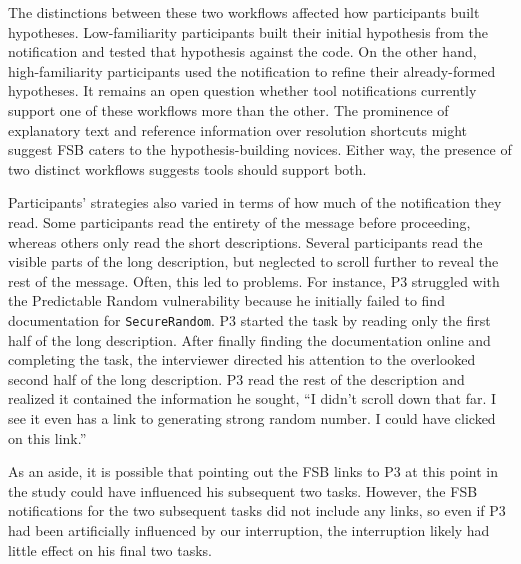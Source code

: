 \documentclass[10pt,journal,compsoc]{IEEEtran}
\begin{document}
The distinctions between these two workflows affected how participants built hypotheses.
Low-familiarity participants built their initial hypothesis from the notification and tested that hypothesis against the code. 
On the other hand, high-familiarity participants used the notification to refine their already-formed hypotheses. 
It remains an open question whether tool notifications currently support one of these workflows more than the other.
The prominence of explanatory text and reference information over resolution shortcuts might suggest FSB caters to the hypothesis-building novices.
Either way, the presence of two distinct workflows suggests tools should support both. 

Participants' strategies also varied in terms of how much of the notification they read.
Some participants read the entirety of the message before proceeding, whereas others only read the short descriptions. 
Several participants read the visible parts of the long description, but neglected to scroll further to reveal the rest of the message.
Often, this led to problems. 
For instance, P3 struggled with the Predictable Random vulnerability because he initially failed to find documentation for \texttt{SecureRandom}.
P3 started the task by reading only the first half of the long description.
After finally finding the documentation online and completing the task, the interviewer directed his attention to the overlooked second half of the long description.
P3 read the rest of the description and realized it contained the information he sought,
``I didn't scroll down that far. I see it even has a link to generating strong random number. I could have clicked on this link.'' 

As an aside, it is possible that pointing out the FSB links to P3 at this point in the study could have influenced his subsequent two tasks.
However, the FSB notifications for the two subsequent tasks did not include any links, so even if P3 had been artificially influenced by our interruption, the interruption likely had little effect on his final two tasks. 

\end{document}
